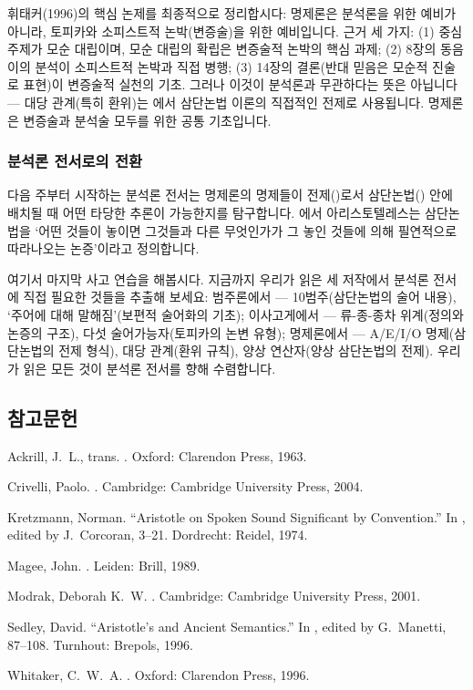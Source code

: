\documentclass[12pt, a4paper]{article}
\begin{document}
휘태커(1996)의 핵심 논제를 최종적으로 정리합시다: 명제론은 분석론을 위한 예비가 아니라, 토피카와 소피스트적 논박(변증술)을 위한 예비입니다. 근거 세 가지: (1) 중심 주제가 모순 대립이며, 모순 대립의 확립은 변증술적 논박의 핵심 과제; (2) 8장의 동음이의 분석이 소피스트적 논박과 직접 병행; (3) 14장의 결론(반대 믿음은 모순적 진술로 표현)이 변증술적 실천의 기초. 그러나 이것이 분석론과 무관하다는 뜻은 아닙니다 --- 대당 관계(특히 환위)는 에서 삼단논법 이론의 직접적인 전제로 사용됩니다. 명제론은 변증술과 분석술 모두를 위한 공통 기초입니다.

\subsubsection{분석론 전서로의 전환}

다음 주부터 시작하는 분석론 전서는 명제론의 명제들이 전제()로서 삼단논법() 안에 배치될 때 어떤 타당한 추론이 가능한지를 탐구합니다. 에서 아리스토텔레스는 삼단논법을 `어떤 것들이 놓이면 그것들과 다른 무엇인가가 그 놓인 것들에 의해 필연적으로 따라나오는 논증'이라고 정의합니다.

여기서 마지막 사고 연습을 해봅시다. 지금까지 우리가 읽은 세 저작에서 분석론 전서에 직접 필요한 것들을 추출해 보세요: 범주론에서 --- 10범주(삼단논법의 술어 내용), `주어에 대해 말해짐'(보편적 술어화의 기초); 이사고게에서 --- 류-종-종차 위계(정의와 논증의 구조), 다섯 술어가능자(토피카의 논변 유형); 명제론에서 --- A/E/I/O 명제(삼단논법의 전제 형식), 대당 관계(환위 규칙), 양상 연산자(양상 삼단논법의 전제). 우리가 읽은 모든 것이 분석론 전서를 향해 수렴합니다.

\subsection*{참고문헌}
\begin{references}

 Ackrill, J.\ L., trans. . Oxford: Clarendon Press, 1963.

 Crivelli, Paolo. . Cambridge: Cambridge University Press, 2004.

 Kretzmann, Norman. ``Aristotle on Spoken Sound Significant by Convention.'' In , edited by J.\ Corcoran, 3--21. Dordrecht: Reidel, 1974.

 Magee, John. . Leiden: Brill, 1989.

 Modrak, Deborah K.\ W. . Cambridge: Cambridge University Press, 2001.

 Sedley, David. ``Aristotle's  and Ancient Semantics.'' In , edited by G.\ Manetti, 87--108. Turnhout: Brepols, 1996.

 Whitaker, C.\ W.\ A. . Oxford: Clarendon Press, 1996.

\end{references}
\end{document}
